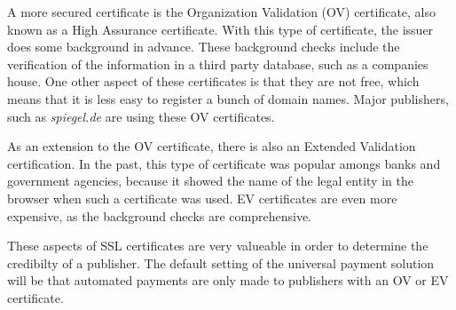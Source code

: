 A more secured certificate is the Organization Validation (OV) certificate, also known as a High Assurance certificate. With this type of certificate, the issuer does some background in advance. These background checks include the verification of the information in a third party database, such as a companies house. One other aspect of these certificates is that they are not free, which means that it is less easy to register a bunch of domain names. Major publishers, such as \textit{spiegel.de} are using these OV certificates.

As an extension to the OV certificate, there is also an Extended Validation certification. In the past, this type of certificate was popular amongs banks and government agencies, because it showed the name of the legal entity in the browser when such a certificate was used. EV certificates are even more expensive, as the background checks are comprehensive.

These aspects of SSL certificates are very valueable in order to determine the credibilty of a publisher. The default setting of the universal payment solution will be that automated payments are only made to publishers with an OV or EV certificate.

